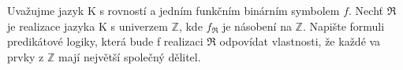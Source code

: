 \subsubsection{}
Uvažujme jazyk K s rovností a jedním funkčním binárním symbolem $f$. Nechť $\Re$
je realizace jazyka K s univerzem $\mathbb{Z}$, kde $f_{\Re}$ je násobení na
$\mathbb{Z}$. Napište formuli predikátové logiky, která bude f realizaci $\Re$
odpovídat vlastnosti, že každé va prvky z $\mathbb{Z}$ mají největší společný
dělitel.
